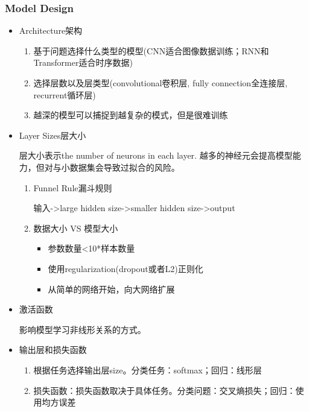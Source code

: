 \documentclass[UTF8]{ctexart}
\begin{document}
\subsubsection{Model Design}
\begin{itemize}
    \item Architecture架构
    \begin{enumerate}
        \item 基于问题选择什么类型的模型(CNN适合图像数据训练；RNN和Transformer适合时序数据)
        \item 选择层数以及层类型(convolutional卷积层, fully connection全连接层, recurrent循环层)
        \item 越深的模型可以捕捉到越复杂的模式，但是很难训练
    \end{enumerate}
    \item Layer Sizes层大小
    
    层大小表示the number of neurons in each layer. 越多的神经元会提高模型能力，但对与小数据集会导致过拟合的风险。
    \begin{enumerate}
        \item Funnel Rule漏斗规则
        
        输入->large hidden size->smaller hidden size->output

        \item 数据大小 VS 模型大小
        
        \begin{itemize}
            \item 参数数量<10*样本数量
            \item 使用regularization(dropout或者L2)正则化
            \item 从简单的网络开始，向大网络扩展
        \end{itemize}
    \end{enumerate}

    \item 激活函数
    
    影响模型学习非线形关系的方式。

    \item 输出层和损失函数
    
    \begin{enumerate}
        \item 根据任务选择输出层size。分类任务：softmax；回归：线形层
        \item 损失函数：损失函数取决于具体任务。分类问题：交叉熵损失；回归：使用均方误差
    \end{enumerate}


\end{itemize}
\end{document}
